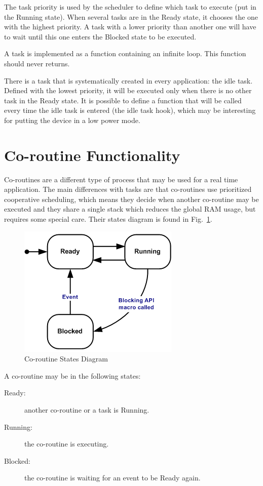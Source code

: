\documentclass[11pt]{report}
\begin{document}
The task priority is used by the scheduler to define which task to execute (put in the Running state). When several tasks are in the Ready state, it chooses the one with the highest priority. A task with a lower priority than another one will have to wait until this one enters the Blocked state to be executed.

A task is implemented as a function containing an infinite loop. This function should never returns.

There is a task that is systematically created in every application: the idle task. Defined with the lowest priority, it will be executed only when there is no other task in the Ready state. It is possible to define a function that will be called every time the idle task is entered (the idle task hook), which may be interesting for putting the device in a low power mode.

\section{Co-routine Functionality}
Co-routines are a different type of process that may be used for a real time application. The main differences with tasks are that co-routines use prioritized cooperative scheduling, which means they decide when another co-routine may be executed and they share a single stack which reduces the global RAM usage, but requires some special care. Their states diagram is found in Fig.~\ref{cr_diagram}.

\begin{figure}[ht]
\begin{center}
\includegraphics[scale=0.5]{figures/crstate.png}
\end{center}
\caption{Co-routine States Diagram}
\label{cr_diagram}
\end{figure}

A co-routine may be in the following states:
\begin{description}
	\item[Ready:] another co-routine or a task is Running.
	\item[Running:] the co-routine is executing.
	\item[Blocked:] the co-routine is waiting for an event to be Ready again.
\end{description}
\end{document}
